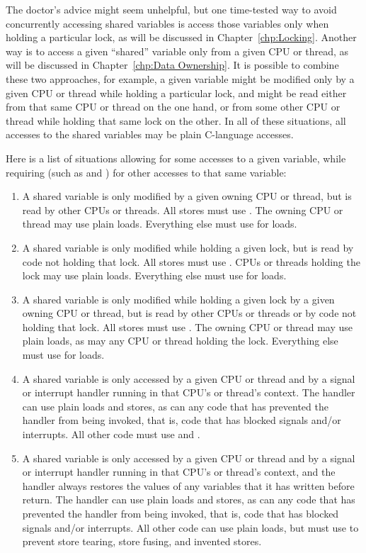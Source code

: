 The doctor's advice might seem unhelpful, but
one time-tested way to avoid concurrently accessing shared variables
is access those variables only when holding a particular lock, as will
be discussed in Chapter~\ref{chp:Locking}.
Another way is to access a given ``shared'' variable only from a given
CPU or thread, as will be discussed in
Chapter~\ref{chp:Data Ownership}.
It is possible to combine these two approaches, for example, a given
variable might be modified only by a given CPU or thread while holding a
particular lock, and might be read either from that same CPU or thread
on the one hand, or from some other CPU or thread while holding that
same lock on the other.
In all of these situations, all accesses to the shared variables may
be plain C-language accesses.

Here is a list of situations
allowing 
for some accesses to a given variable,
while requiring 
(such as  and )
for other accesses to that same variable:

\begin{enumerate}
\item	A shared variable is only modified by a given owning CPU or
	thread, but is read by other CPUs or threads.
	All stores must use .
	The owning CPU or thread may use plain loads.
	Everything else must use  for loads.
\item	A shared variable is only modified while holding a given
	lock, but is read by code not holding that lock.
	All stores must use .
	CPUs or threads holding the lock may use plain loads.
	Everything else must use  for loads.
\item	A shared variable is only modified while holding a given
	lock by a given owning CPU or thread, but is read by other
	CPUs or threads or by code not holding that lock.
	All stores must use .
	The owning CPU or thread may use plain loads, as may any
	CPU or thread holding the lock.
	Everything else must use  for loads.
\item	A shared variable is only accessed by a given CPU or thread
	and by a signal or interrupt handler running in that CPU's
	or thread's context.
	The handler can use plain loads and stores, as can any code
	that has prevented the handler from being invoked, that is,
	code that has blocked signals and/or interrupts.
	All other code must use  and .
\item	A shared variable is only accessed by a given CPU or thread
	and by a signal or interrupt handler running in that CPU's
	or thread's context, and the handler always restores the values of any
	variables that it has written before return.
	The handler can use plain loads and stores, as can any code
	that has prevented the handler from being invoked, that is,
	code that has blocked signals and/or interrupts.
	All other code can use plain loads, but must use 
	to prevent store tearing, store fusing, and invented stores.
\end{enumerate}

